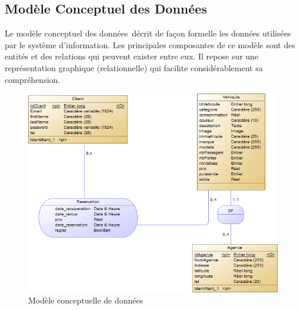 \documentclass[12pt,a4paper]{report}
\begin{document}
			\subsection{Modèle Conceptuel des Données}
Le modèle conceptuel des données décrit de façon formelle les données utilisées par le système d’information. Les principales composantes de ce modèle sont des entités et des relations qui peuvent exister entre eux. Il repose sur une représentation graphique (relationnelle) qui facilite considérablement sa compréhension.
			\vspace{2cm}
			\begin{figure}[!hbtp]
				\centering
				\includegraphics[scale=0.8]{./graphics/mcd.png}
				\caption{Modèle conceptuelle de données}
			\end{figure}
			\newpage
			
\end{document}
